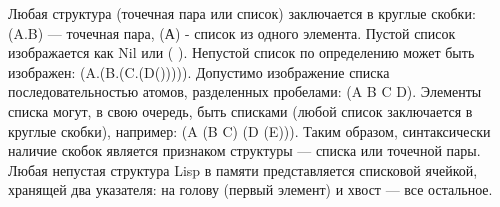 Любая структура (точечная пара или список) заключается в круглые скобки:
(A.B) --- точечная пара, (А) - список из одного элемента. Пустой список изображается как Nil или ( ). Непустой список по определению может быть изображен: (A.(B.(C.(D())))). Допустимо изображение списка последовательностью атомов, разделенных пробелами: (A B C D). Элементы списка могут, в свою очередь, быть списками (любой список заключается в круглые скобки), например: (A (B C) (D (E))). Таким образом, синтаксически наличие скобок является признаком структуры --- списка или точечной пары. Любая непустая структура Lisp в памяти представляется списковой ячейкой, хранящей два указателя: на голову (первый элемент) и хвост --- все остальное.
